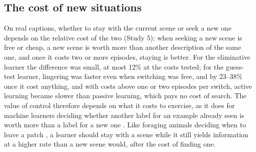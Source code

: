 \documentclass[a4paper,natbib,man]{apa6}
\begin{document}
\subsection{The cost of new situations}
On real captions, whether to stay with the current scene or seek a new one depends on the relative cost of the two (Study 5): when seeking a new scene is free or cheap, a new scene is worth more than another description of the same one, and once it costs two or more episodes, staying is better. For the eliminative learner the difference was small, at most 12\% at the costs tested; for the guess-test learner, lingering was faster even when switching was free, and by 23--38\% once it cost anything, and with costs above one or two episodes per switch, active learning became slower than passive learning, which pays no cost of search. The value of control therefore depends on what it costs to exercise, as it does for machine learners deciding whether another label for an example already seen is worth more than a label for a new one \citep{Sheng:2008,Settles:2008cost}. Like foraging animals deciding when to leave a patch \citep{Charnov:1976}, a learner should stay with a scene while it still yields information at a higher rate than a new scene would, after the cost of finding one.
\end{document}
